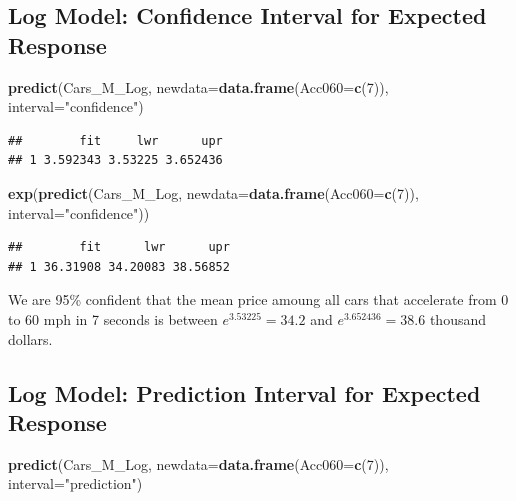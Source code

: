 \documentclass[]{book}
\newenvironment{Shaded}{\begin{snugshade}}{\end{snugshade}}
\newcommand{\KeywordTok}[1]{\textcolor[rgb]{0.13,0.29,0.53}{\textbf{#1}}}
\newcommand{\DataTypeTok}[1]{\textcolor[rgb]{0.13,0.29,0.53}{#1}}
\newcommand{\DecValTok}[1]{\textcolor[rgb]{0.00,0.00,0.81}{#1}}
\newcommand{\StringTok}[1]{\textcolor[rgb]{0.31,0.60,0.02}{#1}}
\newcommand{\NormalTok}[1]{#1}
\begin{document}
\subsection{Log Model: Confidence Interval for Expected
Response}\label{log-model-confidence-interval-for-expected-response}

\begin{Shaded}
\begin{Highlighting}[]
\KeywordTok{predict}\NormalTok{(Cars_M_Log, }\DataTypeTok{newdata=}\KeywordTok{data.frame}\NormalTok{(}\DataTypeTok{Acc060=}\KeywordTok{c}\NormalTok{(}\DecValTok{7}\NormalTok{)), }\DataTypeTok{interval=}\StringTok{"confidence"}\NormalTok{)}
\end{Highlighting}
\end{Shaded}

\begin{verbatim}
##        fit     lwr      upr
## 1 3.592343 3.53225 3.652436
\end{verbatim}

\begin{Shaded}
\begin{Highlighting}[]
\KeywordTok{exp}\NormalTok{(}\KeywordTok{predict}\NormalTok{(Cars_M_Log, }\DataTypeTok{newdata=}\KeywordTok{data.frame}\NormalTok{(}\DataTypeTok{Acc060=}\KeywordTok{c}\NormalTok{(}\DecValTok{7}\NormalTok{)), }\DataTypeTok{interval=}\StringTok{"confidence"}\NormalTok{))}
\end{Highlighting}
\end{Shaded}

\begin{verbatim}
##        fit      lwr      upr
## 1 36.31908 34.20083 38.56852
\end{verbatim}

We are 95\% confident that the mean price amoung all cars that
accelerate from 0 to 60 mph in 7 seconds is between
\(e^{3.53225} =34.2\) and \(e^{3.652436}=38.6\) thousand dollars.

\subsection{Log Model: Prediction Interval for Expected
Response}\label{log-model-prediction-interval-for-expected-response}

\begin{Shaded}
\begin{Highlighting}[]
\KeywordTok{predict}\NormalTok{(Cars_M_Log, }\DataTypeTok{newdata=}\KeywordTok{data.frame}\NormalTok{(}\DataTypeTok{Acc060=}\KeywordTok{c}\NormalTok{(}\DecValTok{7}\NormalTok{)), }\DataTypeTok{interval=}\StringTok{"prediction"}\NormalTok{)}
\end{Highlighting}
\end{Shaded}
\end{document}
